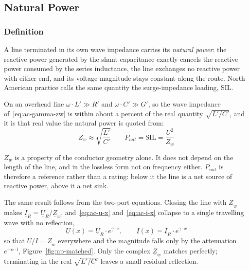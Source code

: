 \subsection{Natural Power}
\label{sec:natural-power}

\subsubsection{Definition}
\label{sec:np-definition}

A line terminated in its own wave impedance carries its \emph{natural
power}: the reactive power generated by the shunt capacitance exactly
cancels the reactive power consumed by the series inductance, the line
exchanges no reactive power with either end, and its voltage magnitude stays
constant along the route. North American practice calls the same quantity
the surge-impedance loading, SIL.

On an overhead line $\omega \cdot L' \gg R'$ and $\omega \cdot C' \gg G'$,
so the wave impedance of~\eqref{eq:ac-gamma-zw} is within about a percent of
the real quantity $\sqrt{L'/C'}$, and it is that real value the natural
power is quoted from:
\begin{equation}
  Z_w \approx \sqrt{\frac{L'}{C'}}
  \qquad
  P_{nat} = \mathrm{SIL} = \frac{U^2}{Z_w}
  \label{eq:np-definition}
\end{equation}

$Z_w$ is a property of the conductor geometry alone. It does not depend on
the length of the line, and in the lossless form not on frequency either.
$P_{nat}$ is therefore a reference rather than a rating: below it the line
is a net source of reactive power, above it a net sink.

The same result follows from the two-port equations. Closing the line with
$\underline{Z}_w$ makes $\underline{I}_R = \underline{U}_R /
\underline{Z}_w$, and~\eqref{eq:ac-u-x} and~\eqref{eq:ac-i-x} collapse to a
single travelling wave with no reflection,
\begin{equation}
  \underline{U}(x) = \underline{U}_R \cdot
      e^{\underline{\gamma} \cdot x},
  \qquad
  \underline{I}(x) = \underline{I}_R \cdot
      e^{\underline{\gamma} \cdot x}
  \label{eq:np-matched}
\end{equation}
so that $\underline{U}/\underline{I} = \underline{Z}_w$ everywhere and the
magnitude falls only by the attenuation $e^{-\alpha \cdot l}$,
Figure~\ref{fig:np-matched}. Only the complex $\underline{Z}_w$ matches
perfectly; terminating in the real $\sqrt{L'/C'}$ leaves a small residual
reflection.

